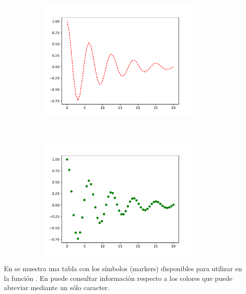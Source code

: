 \begin{figure}[h!]
\begin{subfigure}{0.48\textwidth}
\centering
\includegraphics[width=0.9\textwidth]{img/ch03/plot_color_and_style.pdf}
\label{fig:plot_color_and_style}
\end{subfigure}~
\begin{subfigure}{0.48\textwidth}
\centering
\includegraphics[width=0.9\textwidth]{img/ch03/plot_color_and_style_02.pdf}
\label{fig:plot_color_and_style_02}
\end{subfigure}

\caption{}
\end{figure}


En  se muestra una tabla con los símbolos (markers) 
disponibles para utilizar en la función . En  
puede consultar información respecto a los colores que puede abreviar mediante un sólo caracter.

